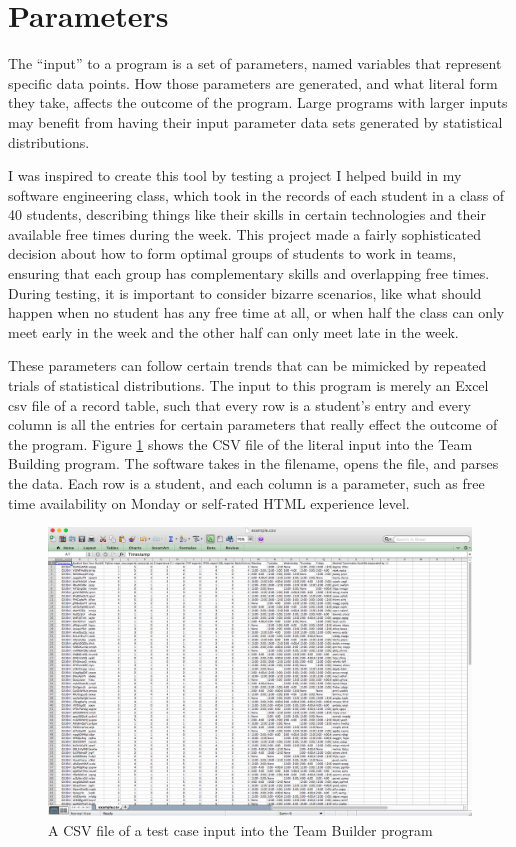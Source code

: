 \section{Parameters}
The ``input'' to a program is a set of parameters, named variables that represent specific data points. How those parameters are generated, and what literal form they take, affects the outcome of the program. Large programs with larger inputs may benefit from having their input parameter data sets generated by statistical distributions.

I was inspired to create this tool by testing a project I helped build in my software engineering class, which took in the records of each student in a class of 40 students, describing things like their skills in certain technologies and their available free times during the week. This project made a fairly sophisticated decision about how to form optimal groups of students to work in teams, ensuring that each group has complementary skills and overlapping free times. During testing, it is important to consider bizarre scenarios, like what should happen when no student has any free time at all, or when half the class can only meet early in the week and the other half can only meet late in the week.

These parameters can follow certain trends that can be mimicked by repeated trials of statistical distributions. The input to this program is merely an Excel csv file of a record table, such that every row is a student's entry and every column is all the entries for certain parameters that really effect the outcome of the program. Figure \ref{fig:teamfile} shows the CSV file of the literal input into the Team Building program. The software takes in the filename, opens the file, and parses the data. Each row is a student, and each column is a parameter, such as free time availability on Monday or self-rated HTML experience level.

\begin{figure}
\includegraphics[scale=0.3]{team-file.png}
\caption{A CSV file of a test case input into the Team Builder program}
\label{fig:teamfile}
\end{figure}

